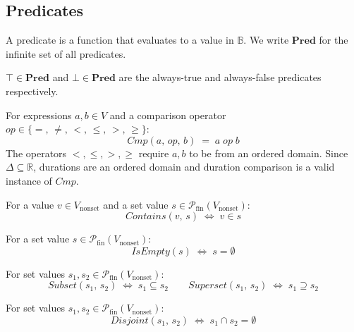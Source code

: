 \subsection{Predicates}\label{subsec:predicates}

A predicate is a function that evaluates to a value in $\mathbb{B}$.
We write $\mathbf{Pred}$ for the infinite set of all predicates.

\begin{definition}\label{def:pred_bool}
    $\top \in \mathbf{Pred}$ and $\bot \in \mathbf{Pred}$ are the always-true and always-false predicates respectively.
\end{definition}

\begin{definition}\label{def:pred_cmp}
    For expressions $a, b \in V$ and a comparison operator $\mathit{op} \in \{=,\, \neq,\, <,\, \leq,\, >,\, \geq\}$:
    \[
        \mathit{Cmp}(a,\, \mathit{op},\, b) \;=\; a \;\mathit{op}\; b
    \]
    The operators $<, \leq, >, \geq$ require $a, b$ to be from an ordered domain.
    Since $\Delta \subseteq \mathbb{R}$, durations are an ordered domain and duration comparison is a valid instance of $\mathit{Cmp}$.
\end{definition}

\begin{definition}\label{def:pred_contains}
    For a value $v \in V_{\text{nonset}}$ and a set value $s \in \mathcal{P}_{\text{fin}}(V_{\text{nonset}})$:
    \[
        \mathit{Contains}(v,\, s) \;\Leftrightarrow\; v \in s
    \]
\end{definition}

\begin{definition}\label{def:pred_empty}
    For a set value $s \in \mathcal{P}_{\text{fin}}(V_{\text{nonset}})$:
    \[
        \mathit{IsEmpty}(s) \;\Leftrightarrow\; s = \emptyset
    \]
\end{definition}

\begin{definition}\label{def:pred_subset}
    For set values $s_1, s_2 \in \mathcal{P}_{\text{fin}}(V_{\text{nonset}})$:
    \[
        \mathit{Subset}(s_1,\, s_2) \;\Leftrightarrow\; s_1 \subseteq s_2
        \qquad
        \mathit{Superset}(s_1,\, s_2) \;\Leftrightarrow\; s_1 \supseteq s_2
    \]
\end{definition}

\begin{definition}\label{def:pred_disjoint}
    For set values $s_1, s_2 \in \mathcal{P}_{\text{fin}}(V_{\text{nonset}})$:
    \[
        \mathit{Disjoint}(s_1,\, s_2) \;\Leftrightarrow\; s_1 \cap s_2 = \emptyset
    \]
\end{definition}


